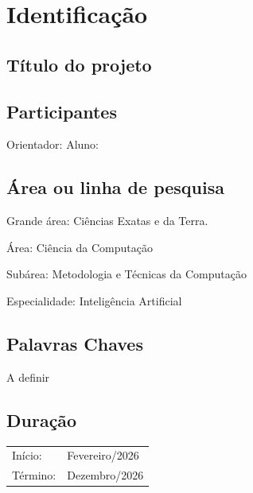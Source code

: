 \section{Identificação}

\subsection{Título do projeto}
    \titulo

\subsection{Participantes}
Orientador: \orientador
Aluno: \nome

\subsection{Área ou linha de pesquisa}
Grande área: Ciências Exatas e da Terra.

Área: Ciência da Computação

Subárea: Metodologia e Técnicas da Computação

Especialidade: Inteligência Artificial

\subsection{Palavras Chaves}
A definir

\subsection{Duração}
\begin{table}[H]
    \begin{tabular}{ll}
        Início: & Fevereiro/2026\\
        Término: & Dezembro/2026\\
    \end{tabular}
\end{table}